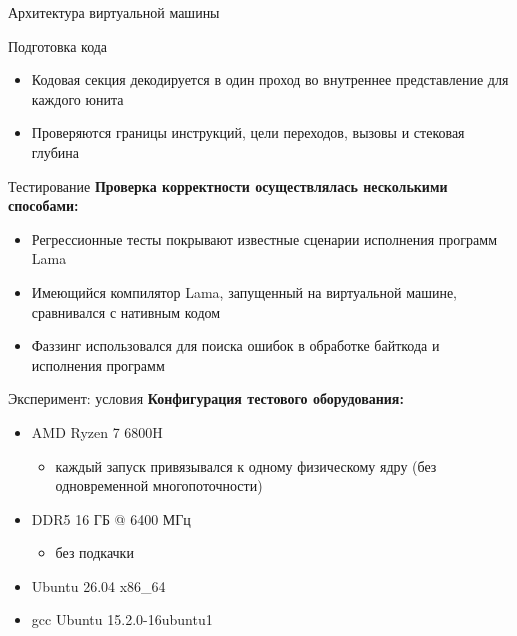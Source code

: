 \documentclass
  [ russian
  , aspectratio=1610
  ] {beamer}
\begin{document}
\begin{frame}{Архитектура виртуальной машины}
    \begin{center}
        \resizebox{0.96\linewidth}{!}{}
    \end{center}
\end{frame}

\begin{frame}{Подготовка кода}
    \begin{center}
        \resizebox{0.92\linewidth}{!}{}
    \end{center}
    \begin{itemize}
        \item Кодовая секция декодируется в один проход во внутреннее представление для каждого юнита
        \item Проверяются границы инструкций, цели переходов, вызовы и стековая глубина
    \end{itemize}
\end{frame}


\begin{frame}{Тестирование}
      \textbf{Проверка корректности осуществлялась несколькими способами:}
      \begin{itemize}
        \item Регрессионные тесты покрывают известные сценарии исполнения программ Lama
        \item Имеющийся компилятор Lama, запущенный на виртуальной машине, сравнивался с нативным кодом
        \item Фаззинг использовался для поиска ошибок в обработке байткода и исполнения программ
        \end{itemize}
\end{frame}

\begin{frame}{Эксперимент: условия}
    \textbf{Конфигурация тестового оборудования:}
    \begin{itemize}
    \item AMD Ryzen 7 6800H
    \begin{itemize}
      \item каждый запуск привязывался к одному физическому ядру (без одновременной многопоточности)
    \end{itemize}
    \item DDR5 16 ГБ @ 6400 МГц
    \begin{itemize}
      \item без подкачки
    \end{itemize}
    \item Ubuntu 26.04 x86\_64 
    \item gcc Ubuntu 15.2.0-16ubuntu1
    \end{itemize}
\end{frame}
\end{document}
